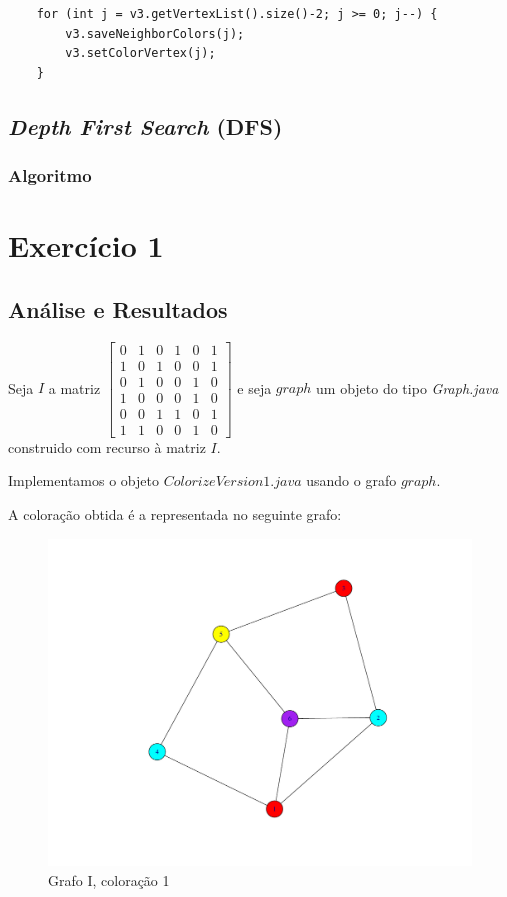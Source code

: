 \documentclass[a4paper,12pt]{report}
\begin{document}
\begin{lstlisting}
    for (int j = v3.getVertexList().size()-2; j >= 0; j--) {
        v3.saveNeighborColors(j);
        v3.setColorVertex(j);
    }
\end{lstlisting}

\section{\textit{Depth First Search} (DFS)}

\subsection{Algoritmo}

\chapter{Exercício 1}

\section{Análise e Resultados}

Seja $I$ a matriz 
$\begin{bmatrix}
    0&1&0&1&0&1\\
    1&0&1&0&0&1\\
    0&1&0&0&1&0\\
    1&0&0&0&1&0\\
    0&0&1&1&0&1\\
    1&1&0&0&1&0
\end{bmatrix}$ e seja $graph$ um objeto do tipo \textit{Graph.java} construido com recurso à matriz $I$.

Implementamos o objeto $ColorizeVersion1.java$ usando o grafo $graph$.

A coloração obtida é a representada no seguinte grafo:

\begin{figure}[H]
    \centering
        \includegraphics[scale=0.3]{img/v1I.pdf}
    \caption{Grafo I, coloração 1}
    \label{fig:v1I}
\end{figure}
\end{document}
